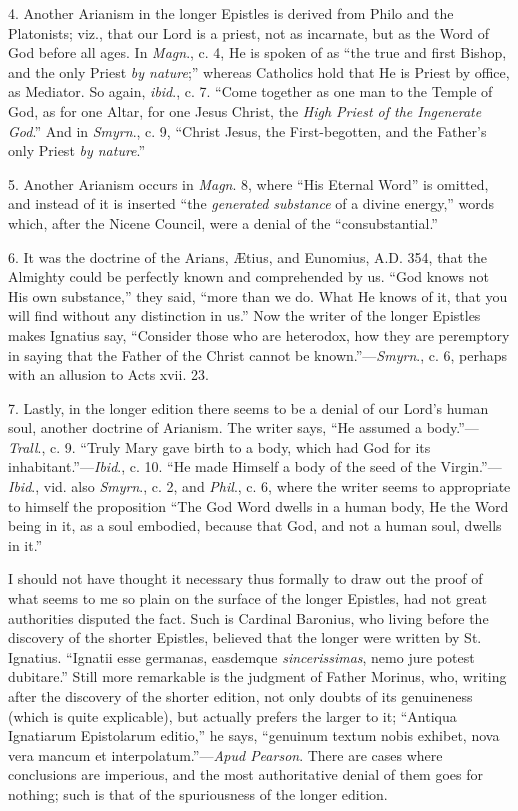 4. Another Arianism in the
longer Epistles is derived from Philo and the Platonists; viz., that
our Lord is a priest, not as incarnate, but as the Word of God before
all ages. In \emph{Magn}., c. 4, He is spoken of as ``the true and
first Bishop, and the only Priest \emph{by nature};'' whereas Catholics
hold that He is Priest by office, as Mediator. So again, \emph{ibid}.,
c. 7. ``Come together as one man to the Temple of God, as for one
Altar, for one Jesus Christ, the \emph{High Priest of the Ingenerate God}.''
And in \emph{Smyrn}., c. 9, ``Christ Jesus, the First-begotten, and the
Father's only Priest \emph{by nature}.''

5. Another Arianism occurs in \emph{Magn}.
8, where ``His Eternal Word'' is omitted, and instead of it is inserted ``the
\emph{generated substance} of a divine energy,'' words which,
after the Nicene Council, were a denial of the ``consubstantial.''

6. It was the doctrine of the
Arians, Ætius, and Eunomius, A.D. 354, that the Almighty
could be perfectly known and comprehended by us. ``God knows not His
own substance,'' they said, ``more than we do. What He knows of it, that
you will find without any distinction in us.'' Now the writer of the
longer Epistles makes Ignatius say, ``Consider those who are heterodox,
how they are peremptory in saying that the Father of the Christ cannot
be known.''—\emph{Smyrn}., c. 6, perhaps with an allusion to Acts
xvii. 23.

7. Lastly, in the longer
edition there seems to be a denial of our Lord's human soul, another
doctrine of Arianism. The writer says, ``He assumed a body.''—\emph{Trall}.,
c. 9. ``Truly Mary gave birth to a body, which had God for its
inhabitant.''—\emph{Ibid}., c. 10. ``He made Himself a body of the
seed of the Virgin.''—\emph{Ibid}., vid. also \emph{Smyrn}., c. 2,
and \emph{Phil}., c. 6, where the writer seems to appropriate to
himself the proposition ``The God Word dwells in a human body, He the
Word being in it, as a soul embodied, because that God, and not a
human soul, dwells in it.''

I should not have thought it
necessary thus formally to draw out the proof of what seems to me so
plain on the surface of the longer Epistles, had not great authorities
disputed the fact. Such is Cardinal Baronius, who living before the
discovery of the shorter Epistles, believed that the longer were
written by St. Ignatius. ``Ignatii esse germanas, easdemque \emph{sincerissimas},
nemo jure potest dubitare.'' Still more remarkable is the
judgment of Father Morinus, who, writing after the discovery of the
shorter edition, not only doubts of its genuineness (which is quite
explicable), but actually prefers the larger to it; ``Antiqua
Ignatiarum Epistolarum editio,'' he says, ``genuinum textum nobis
exhibet, nova vera mancum et interpolatum.''—\emph{Apud Pearson}.
There are cases where conclusions are imperious, and the most
authoritative denial of them goes for nothing; such is that of the
spuriousness of the longer edition.

